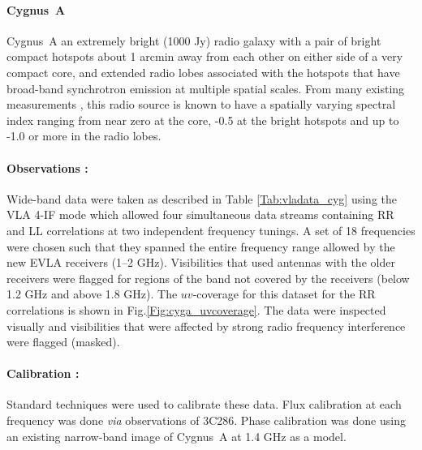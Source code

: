 \documentclass[structabstract]{stylefiles/aa}
\renewcommand{\cite}{\citep}
\begin{document}
\paragraph{Cygnus~A } 
Cygnus~A an extremely bright (1000 Jy) radio galaxy with 
a pair of bright compact hotspots about 1 arcmin away from each other on either
side of a very compact core, 
and extended radio lobes associated with the hotspots that have  
broad-band synchrotron emission at multiple spatial scales. 
From many existing measurements \cite{CYGA_1996}, this radio source is
known to have a spatially varying spectral
index ranging from near zero at the core, -0.5 at the bright hotspots and up to
-1.0 or more in the radio lobes. 

\paragraph{Observations : } Wide-band data were taken as described in 
Table \ref{Tab:vladata_cyg} using the
VLA 4-IF mode which allowed four simultaneous data streams containing
RR and LL correlations at two independent frequency tunings.
A set of 18 frequencies were chosen such that they spanned
the entire frequency range allowed by the new EVLA receivers (1--2 GHz).
Visibilities that used antennas with the older receivers were flagged for regions of 
the band not covered by the receivers (below 1.2 GHz and above 1.8 GHz). 
The $uv$-coverage for this dataset for the RR correlations is shown
in Fig.\ref{Fig:cyga_uvcoverage}.
The data were inspected visually and visibilities that were affected by 
strong radio frequency interference were flagged (masked).

\paragraph{Calibration :} 
Standard techniques were used to calibrate these data.
Flux calibration at each frequency was done {\it via} observations of 3C286.
Phase calibration was done using 
an existing narrow-band image of Cygnus~A at 1.4 GHz 
\cite{CYGA_1991} as a model. 
\end{document}
